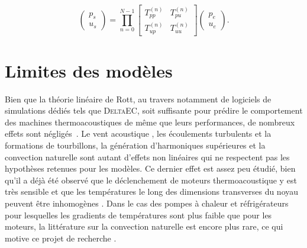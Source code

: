 \begin{equation}
\begin{pmatrix}
p_s\\
u_s
\end{pmatrix} = \prod_{n=0}^{N-1} \begin{bmatrix}
T_{pp}^{(n)} & T_{pu}^{(n)}\\
T_{up}^{(n)} & T_{uu}^{(n)}
\end{bmatrix}\begin{pmatrix}
p_e\\
u_e
\end{pmatrix}.
\label{eq:TMatrix_prod_TppTuu}
\end{equation}

\section{Limites des modèles}


Bien que la théorie linéaire de Rott, au travers notamment de logiciels de simulations dédiés tels que \textsc{DeltaEC}, soit suffisante pour prédire le comportement des machines thermoacoustiques de même que leurs performances, de nombreux effets sont négligés~\cite{DeltaEC}. Le vent acoustique \cite{so_internal_2006, bailliet_acoustic_2001, ramadan_experimental_2018}, les écoulements turbulents et la formations de tourbillons, la génération d'harmoniques supérieures et la convection naturelle sont autant d'effets non linéaires qui ne respectent pas les hypothèses retenues pour les modèles. Ce dernier effet est assez peu étudié, bien qu'il a déjà été observé que le déclenchement de moteurs thermoacoustique y est très sensible et que les températures le long des dimensions transverses du noyau peuvent être inhomogènes \cite{ross_influence_2003, ramadan_experimental_2018, hireche_numerical_2019}. Dans le cas des pompes à chaleur et réfrigérateurs pour lesquelles les gradients de températures sont plus faible que pour les moteurs, la littérature sur la convection naturelle est encore plus rare, ce qui motive ce projet de recherche \cite{zhang_novel_2011, babaei_investigation_2010}.


